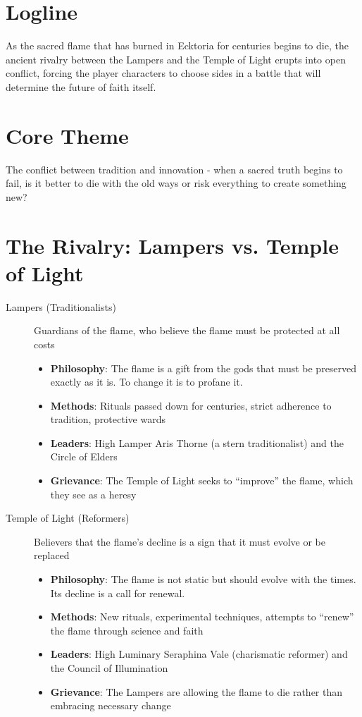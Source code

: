 \documentclass[12pt]{article}
\begin{document}





\section{Logline}
As the sacred flame that has burned in Ecktoria for centuries begins to die, the ancient rivalry between the Lampers and the Temple of Light erupts into open conflict, forcing the player characters to choose sides in a battle that will determine the future of faith itself.

\section{Core Theme}
The conflict between tradition and innovation - when a sacred truth begins to fail, is it better to die with the old ways or risk everything to create something new?

\section{The Rivalry: Lampers vs. Temple of Light}

\begin{description}
    \item[Lampers (Traditionalists)] Guardians of the flame, who believe the flame must be protected at all costs
    
    \begin{itemize}
        \item \textbf{Philosophy}: The flame is a gift from the gods that must be preserved exactly as it is. To change it is to profane it.
        \item \textbf{Methods}: Rituals passed down for centuries, strict adherence to tradition, protective wards
        \item \textbf{Leaders}: High Lamper Aris Thorne (a stern traditionalist) and the Circle of Elders
        \item \textbf{Grievance}: The Temple of Light seeks to ``improve'' the flame, which they see as a heresy
    \end{itemize}
    
    \item[Temple of Light (Reformers)] Believers that the flame's decline is a sign that it must evolve or be replaced
    
    \begin{itemize}
        \item \textbf{Philosophy}: The flame is not static but should evolve with the times. Its decline is a call for renewal.
        \item \textbf{Methods}: New rituals, experimental techniques, attempts to ``renew'' the flame through science and faith
        \item \textbf{Leaders}: High Luminary Seraphina Vale (charismatic reformer) and the Council of Illumination
        \item \textbf{Grievance}: The Lampers are allowing the flame to die rather than embracing necessary change
    \end{itemize}
\end{description}
\end{document}
